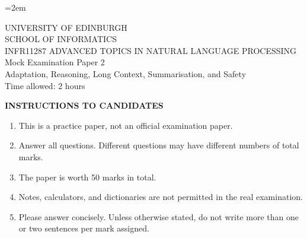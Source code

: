 \documentclass[11pt,a4paper]{article}
\begin{document}
\emergencystretch=2em

\begin{center}
{\Large UNIVERSITY OF EDINBURGH}\\[0.3em]
{\large SCHOOL OF INFORMATICS}\\[2em]
{\Large INFR11287 ADVANCED TOPICS IN NATURAL LANGUAGE PROCESSING}\\[1em]
{\Large Mock Examination Paper 2}\\[0.8em]
{\large Adaptation, Reasoning, Long Context, Summarisation, and Safety}\\[2em]
{\large Time allowed: 2 hours}\\[1em]
\end{center}

\noindent\textbf{INSTRUCTIONS TO CANDIDATES}
\begin{enumerate}
\item This is a practice paper, not an official examination paper.
\item Answer all questions. Different questions may have different numbers of total marks.
\item The paper is worth 50 marks in total.
\item Notes, calculators, and dictionaries are not permitted in the real examination.
\item Please answer concisely. Unless otherwise stated, do not write more than one or two sentences per mark assigned.
\end{enumerate}

\newpage
\end{document}
